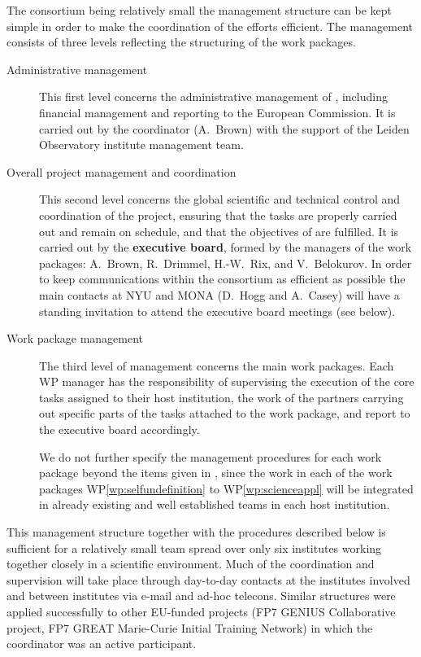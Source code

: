 The {\acro} consortium being relatively small the management structure can be kept simple in order to make the coordination of the efforts efficient. The management consists of three levels reflecting the structuring of the {\acro} work packages.
\begin{description}
    \item[Administrative management] This first level concerns the administrative management of {\acro}, including financial management and reporting to the European Commission. It is carried out by the {\acro} coordinator (A.~Brown) with the support of the Leiden Observatory institute management team.
    \item[Overall project management and coordination] This second level concerns the global scientific and technical control and coordination of the project, ensuring that the tasks are properly carried out and remain on schedule, and that the objectives of {\acro} are fulfilled. It is carried out by the \textbf{{\acro} executive board}, formed by the managers of the work packages: A.~Brown, R.~Drimmel, H.-W.~Rix, and V.~Belokurov. In order to keep communications within the consortium as efficient as possible the main contacts at NYU and MONA (D.~Hogg and A.~Casey) will have a standing invitation to attend the executive board meetings (see below).
    \item[Work package management] The third level of management concerns the main work packages. Each WP manager has the responsibility of supervising the execution of the core tasks assigned to their host institution, the work of the partners carrying out specific parts of the tasks attached to the work package, and report to the executive board accordingly.
    
    We do not further specify the management procedures for each work package beyond the items given in , since the work in each of the work packages WP\ref{wp:selfundefinition} to WP\ref{wp:scienceappl} will be integrated in already existing and well established teams in each host institution.
\end{description}

This management structure together with the procedures described below is sufficient for a relatively small team spread over only six institutes working together closely in a scientific environment. Much of the coordination and supervision will take place through day-to-day contacts at the institutes involved and between institutes via e-mail and ad-hoc telecons. Similar structures were applied successfully to other EU-funded projects (FP7 GENIUS Collaborative project, FP7 GREAT Marie-Curie Initial Training Network) in which the coordinator was an active participant.

